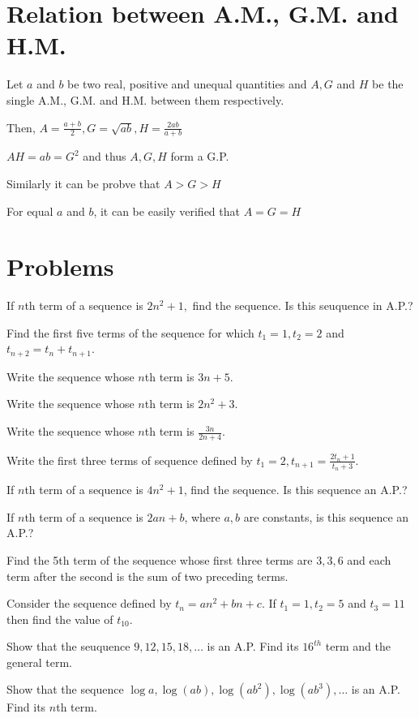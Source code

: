 \section{Relation between A.M., G.M. and H.M.}
Let $a$ and $b$ be two real, positive and unequal quantities and $A, G$ and $H$ be the single A.M., G.M. and H.M. between them
respectively.

Then, $A = \frac{a + b}{2}, G = \sqrt{ab}, H = \frac{2ab}{a + b}$

$AH = ab = G^2$ and thus $A, G, H$ form a G.P.

Similarly it can be probve that $A > G > H$

For equal $a$ and $b$, it can be easily verified that $A = G = H$

\section{Problems}
\startitemize[n, 1*broad]
\item If $n$th term of a sequence is $2n^2 + 1,$ find the sequence. Is this seuquence in A.P.?
\item Find the first five terms of the sequence for which $t_1 = 1, t_2 = 2$ and $t_{n + 2} = t_n + t_{n + 1}$.
\item Write the sequence whose $n$th term is $3n + 5$.
\item Write the sequence whose $n$th term is $2n^2 + 3$.
\item Write the sequence whose $n$th term is $\frac{3n}{2n + 4}$.
\item Write the first three terms of sequence defined by $t_1 = 2, t_{n + 1} = \frac{2t_n + 1}{t_n + 3}$.
\item If $n$th term of a sequence is $4n^2 + 1$, find the sequence. Is this sequence an A.P.?
\item If $n$th term of a sequence is $2an + b$, where $a, b$ are constants, is this sequence an A.P.?
\item Find the 5th term of the sequence whose first three terms are $3, 3, 6$ and each term after the second is the sum of two
  preceding terms.
\item Consider the sequence defined by $t_n = an^2 + bn + c$. If $t_1 = 1, t_2 = 5$ and $t_3 = 11$ then find the value of
  $t_{10}$.
\item Show that the seuquence $9, 12, 15, 18, \ldots$ is an A.P. Find its $16^{th}$ term and the general term.
\item Show that the sequence $\log a, \log (ab), \log(ab^2), \log (ab^3), \ldots$ is an A.P. Find its $n$th term.
